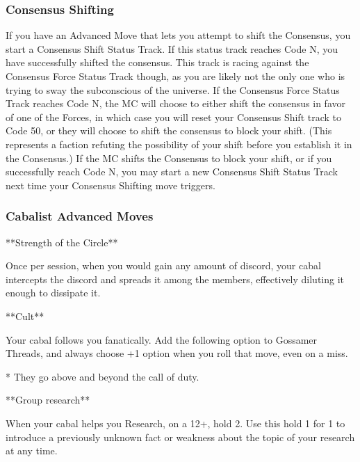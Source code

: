 \documentclass[
  oneside,
  statementpaper,
  9pt]{memoir}
\begin{document}
\hypertarget{consensus-shifting}{%
\subsubsection{Consensus Shifting}\label{consensus-shifting}}

\begin{Player}

If you have an Advanced Move that lets you attempt to shift the Consensus, you start a Consensus Shift Status Track. If this status track reaches Code N, you have successfully shifted the consensus. This track is racing against the Consensus Force Status Track though, as you are likely not the only one who is trying to sway the subconscious of the universe. If the Consensus Force Status Track reaches Code N, the MC will choose to either shift the consensus in favor of one of the Forces, in which case you will reset your Consensus Shift track to Code 50, or they will choose to shift the consensus to block your shift. (This represents a faction refuting the possibility of your shift before you establish it in the Consensus.)  If the MC shifts the Consensus to block your shift, or if you successfully reach Code N, you may start a new Consensus Shift Status Track next time your Consensus Shifting move triggers.

\end{Player}

\hypertarget{cabalist-advanced-moves}{%
\subsubsection{Cabalist Advanced Moves}\label{cabalist-advanced-moves}}

\begin{Player}

**Strength of the Circle**

Once per session, when you would gain any amount of discord, your cabal intercepts the discord and spreads it among the members, effectively diluting it enough to dissipate it.

**Cult**

Your cabal follows you fanatically. Add the following option to Gossamer Threads, and always choose +1 option when you roll that move, even on a miss.

* They go above and beyond the call of duty.

**Group research**

When your cabal helps you Research, on a 12+, hold 2. Use this hold 1 for 1 to introduce a previously unknown fact or weakness about the topic of your research at any time.

\end{Player}
\end{document}

